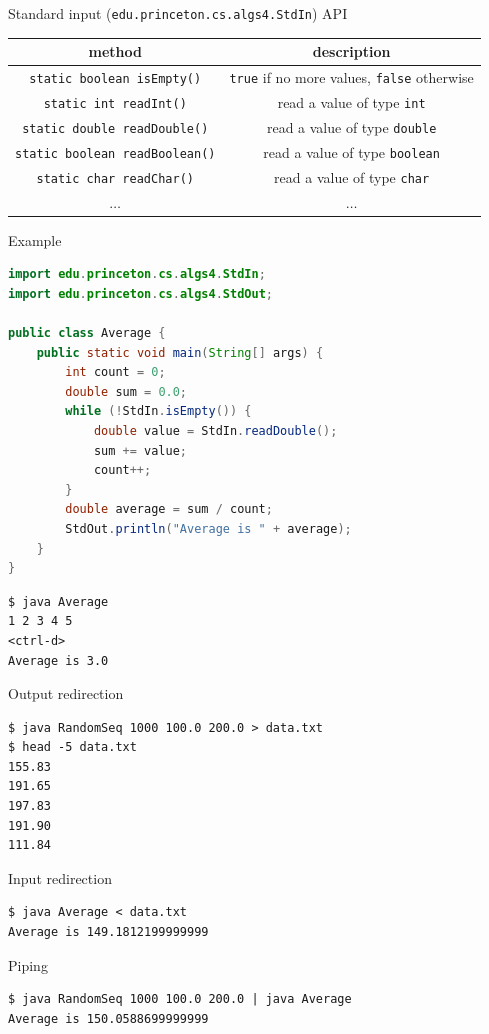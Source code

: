 \documentclass[8pt,a4paper,compress]{beamer}
\begin{document}
\begin{frame}[fragile]
\pause

Standard input (\lstinline{edu.princeton.cs.algs4.StdIn}) API
\begin{center}
\begin{tabular}{cc}
method & description \\ \hline
\lstinline$static boolean isEmpty()$ & \lstinline$true$ if no more values, \lstinline$false$ otherwise \\
\lstinline$static int readInt()$ & read a value of type \lstinline$int$ \\
\lstinline$static double readDouble()$ & read a value of type \lstinline$double$ \\
\lstinline$static boolean readBoolean()$ & read a value of type \lstinline$boolean$ \\
\lstinline$static char readChar()$ & read a value of type \lstinline$char$ \\
$\dots$ & $\dots$ 
\end{tabular} 
\end{center}

\pause
\bigskip

Example
\begin{lstlisting}[language=Java]
import edu.princeton.cs.algs4.StdIn;
import edu.princeton.cs.algs4.StdOut;

public class Average { 
    public static void main(String[] args) { 
        int count = 0; 
        double sum = 0.0;
        while (!StdIn.isEmpty()) {
            double value = StdIn.readDouble();
            sum += value;
            count++;
        }
        double average = sum / count;
        StdOut.println("Average is " + average);
    }
}
\end{lstlisting}

\pause

\begin{lstlisting}[language={}]
$ java Average
1 2 3 4 5
<ctrl-d>
Average is 3.0
\end{lstlisting}
\end{frame}

\begin{frame}[fragile]
\pause

Output redirection
\begin{lstlisting}[language={}]
$ java RandomSeq 1000 100.0 200.0 > data.txt
$ head -5 data.txt
155.83
191.65
197.83
191.90
111.84
\end{lstlisting}

\pause
\bigskip

Input redirection
\begin{lstlisting}[language={}]
$ java Average < data.txt
Average is 149.1812199999999
\end{lstlisting}

\pause
\bigskip

Piping
\begin{lstlisting}[language={}]
$ java RandomSeq 1000 100.0 200.0 | java Average
Average is 150.0588699999999
\end{lstlisting}
\end{frame}
\end{document}

